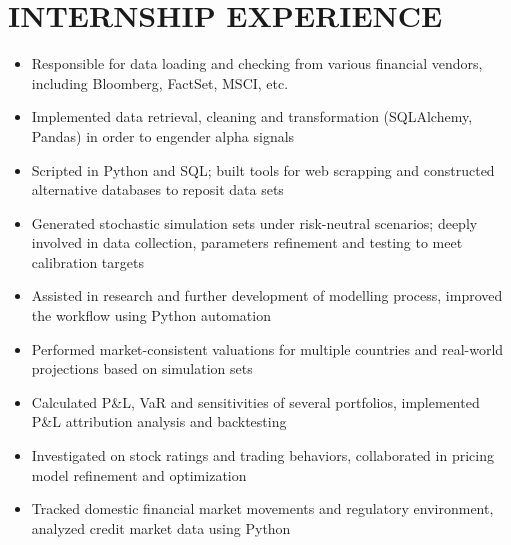 \documentclass[classic]{resume}
\begin{document}
    \section{INTERNSHIP EXPERIENCE}
    \begin{itemize}
        \item Responsible for data loading and checking from various financial vendors, including Bloomberg, FactSet, MSCI, etc.
        \item Implemented data retrieval, cleaning and transformation (SQLAlchemy, Pandas) in order to engender alpha signals
        \item Scripted in Python and SQL; built tools for web scrapping and constructed alternative databases to reposit data sets
    \end{itemize}
    \begin{itemize}
        \item Generated stochastic simulation sets under risk-neutral scenarios; deeply involved in data collection, parameters refinement and testing to meet calibration targets
        \item Assisted in research and further development of modelling process, improved the workflow using Python automation
        \item Performed market-consistent valuations for multiple countries and real-world projections based on simulation sets
    \end{itemize}
    \begin{itemize}
        \item Calculated P\&L, VaR and sensitivities of several portfolios, implemented P\&L attribution analysis and backtesting
        \item Investigated on stock ratings and trading behaviors, collaborated in pricing model refinement and optimization
        \item Tracked domestic financial market movements and regulatory environment, analyzed credit market data using Python
    \end{itemize}
\end{document}
